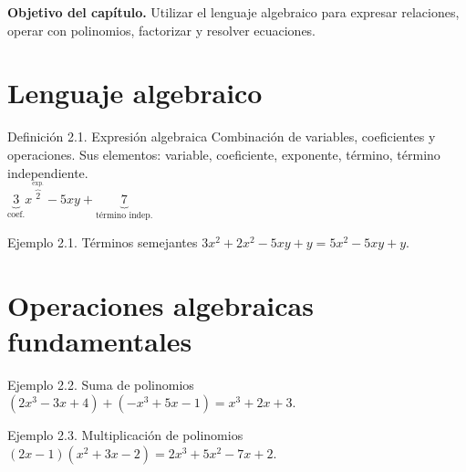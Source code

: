 \documentclass[12pt,letterpaper]{book}
\begin{document}
\begin{center}
\end{center}

\textbf{Objetivo del capítulo.} Utilizar el lenguaje algebraico para expresar relaciones, operar con polinomios, factorizar y resolver ecuaciones.

\section{Lenguaje algebraico}

\begin{defbox}{Definición 2.1. Expresión algebraica}
Combinación de variables, coeficientes y operaciones. Sus elementos: variable, coeficiente, exponente, término, término independiente.\\[4pt]
\centering $\underbrace{3}_{\text{coef.}}x^{\overbrace{2}^{\text{exp.}}} - 5xy + \underbrace{7}_{\text{término indep.}}$
\end{defbox}

\begin{ejbox}{Ejemplo 2.1. Términos semejantes}
$3x^2+2x^2-5xy+y = 5x^2-5xy+y$.
\end{ejbox}

\section{Operaciones algebraicas fundamentales}

\begin{ejbox}{Ejemplo 2.2. Suma de polinomios}
$(2x^3-3x+4)+(-x^3+5x-1)=x^3+2x+3$.
\end{ejbox}

\begin{ejbox}{Ejemplo 2.3. Multiplicación de polinomios}
$(2x-1)(x^2+3x-2)=2x^3+5x^2-7x+2$.
\end{ejbox}
\end{document}
